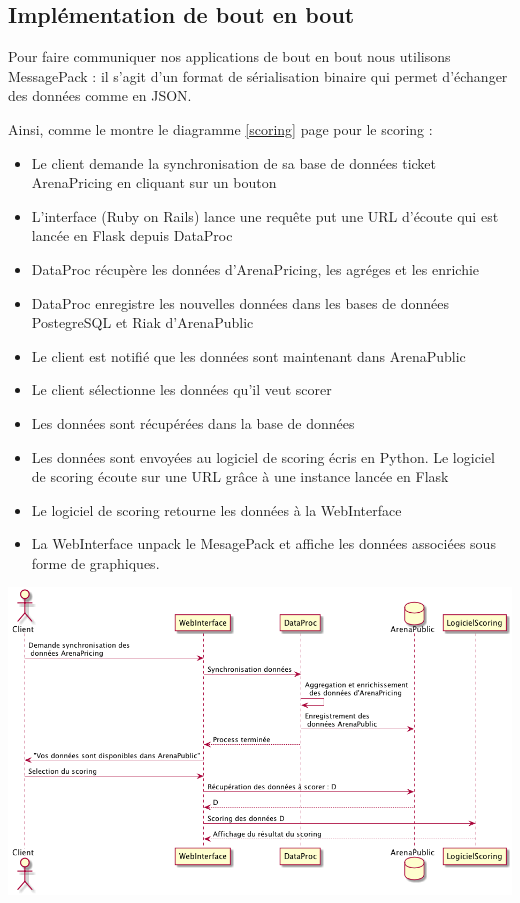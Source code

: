 \subsection{Implémentation de bout en bout}
Pour faire communiquer nos applications de bout en bout nous utilisons MessagePack : il s'agit d'un format de sérialisation binaire qui permet d'échanger des données comme en JSON.

Ainsi, comme le montre le diagramme \ref{scoring} page \pageref{scoring} pour le scoring : 

\begin{itemize}
  \item[\textbullet] Le client demande la synchronisation de sa base de données ticket ArenaPricing en cliquant sur un bouton
  \item[\textbullet] L'interface (Ruby on Rails) lance une requête put une URL d'écoute qui est lancée en Flask depuis DataProc
  \item[\textbullet] DataProc récupère les données d'ArenaPricing, les agréges et les enrichie
  \item[\textbullet] DataProc enregistre les nouvelles données dans les bases de données PostegreSQL et Riak d'ArenaPublic
  \item[\textbullet] Le client est notifié que les données sont maintenant dans ArenaPublic
  \item[\textbullet] Le client sélectionne les données qu'il veut scorer
  \item[\textbullet] Les données sont récupérées dans la base de données
  \item[\textbullet] Les données sont envoyées au logiciel de scoring écris en Python. Le logiciel de scoring écoute sur une URL grâce à une instance lancée en Flask
  \item[\textbullet] Le logiciel de scoring retourne les données à la WebInterface
  \item[\textbullet] La WebInterface unpack le MesagePack et affiche les données associées sous forme de graphiques. 
 

\end{itemize} 

\begin{center}
\includegraphics[scale=0.52]{images/scoring.png}
\label{scoring}
\end{center}


